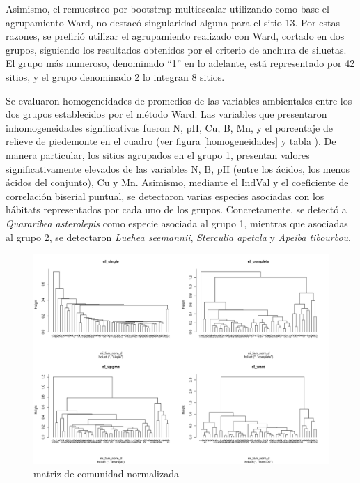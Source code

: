 \documentclass[11pt,]{article}
\begin{document}
Asimismo, el remuestreo por bootstrap multiescalar utilizando como base
el agrupamiento Ward, no destacó singularidad alguna para el sitio 13.
Por estas razones, se prefirió utilizar el agrupamiento realizado con
Ward, cortado en dos grupos, siguiendo los resultados obtenidos por el
criterio de anchura de siluetas. El grupo más numeroso, denominado ``1''
en lo adelante, está representado por 42 sitios, y el grupo denominado 2
lo integran 8 sitios.

Se evaluaron homogeneidades de promedios de las variables ambientales
entre los dos grupos establecidos por el método Ward. Las variables que
presentaron inhomogeneidades significativas fueron N, pH, Cu, B, Mn, y
el porcentaje de relieve de piedemonte en el cuadro (ver figura
\ref{homogeneidades} y tabla \label{promedio}). De manera particular,
los sitios agrupados en el grupo 1, presentan valores significativamente
elevados de las variables N, B, pH (entre los ácidos, los menos ácidos
del conjunto), Cu y Mn. Asimismo, mediante el IndVal y el coeficiente de
correlación biserial puntual, se detectaron varias especies asociadas
con los hábitats representados por cada uno de los grupos.
Concretamente, se detectó a \emph{Quararibea asterolepis} como especie
asociada al grupo 1, mientras que asociadas al grupo 2, se detectaron
\emph{Luehea seemannii}, \emph{Sterculia apetala} y \emph{Apeiba
tibourbou}.

\begin{figure}
\centering
\includegraphics[width=1.00000\textwidth]{enlaces_metodos_diferentes.png}
\caption{matriz de comunidad normalizada\label{agrupado}}
\end{figure}
\end{document}
